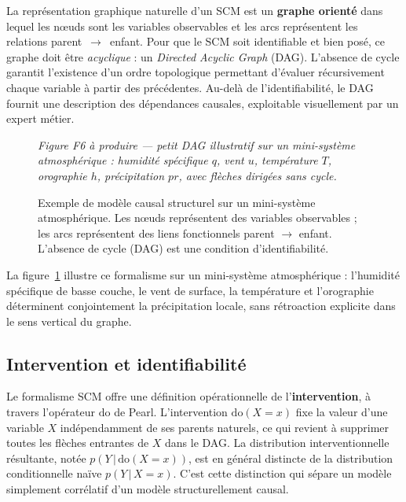 \documentclass[14pt,a4paper,openany]{extreport}
\theoremstyle{definition}
\newcommand{\figplaceholder}[2][0.9\linewidth]{%
  \begin{tcolorbox}[width=#1,height=5cm,valign=center,colback=gray!8,colframe=gray!45,arc=2pt,boxrule=0.5pt]
    \centering\small\textit{#2}
  \end{tcolorbox}%
}
\begin{document}
La représentation graphique naturelle d'un SCM est un \textbf{graphe orienté} dans lequel les n\oe uds sont les variables observables et les arcs représentent les relations parent~$\to$~enfant. Pour que le SCM soit identifiable et bien posé, ce graphe doit être \emph{acyclique} : un \emph{Directed Acyclic Graph} (DAG). L'absence de cycle garantit l'existence d'un ordre topologique permettant d'évaluer récursivement chaque variable à partir des précédentes. Au-delà de l'identifiabilité, le DAG fournit une description des dépendances causales, exploitable visuellement par un expert métier.

\begin{figure}[ht]
  \centering
  \figplaceholder[0.7\linewidth]{Figure F6 à produire --- petit DAG illustratif sur un mini-système atmosphérique : humidité spécifique $q$, vent $u$, température $T$, orographie $h$, précipitation $pr$, avec flèches dirigées sans cycle.}
  \caption{Exemple de modèle causal structurel sur un mini-système atmosphérique. Les n\oe uds représentent des variables observables ; les arcs représentent des liens fonctionnels parent $\to$ enfant. L'absence de cycle (DAG) est une condition d'identifiabilité.}
  \label{fig:scm-dag}
\end{figure}

La figure~\ref{fig:scm-dag} illustre ce formalisme sur un mini-système atmosphérique : l'humidité spécifique de basse couche, le vent de surface, la température et l'orographie déterminent conjointement la précipitation locale, sans rétroaction explicite dans le sens vertical du graphe.

\subsection{Intervention et identifiabilité}
\label{ssec:intervention}

Le formalisme SCM offre une définition opérationnelle de l'\textbf{intervention}, à travers l'opérateur $\mathrm{do}$ de Pearl. L'intervention $\mathrm{do}(X = x)$ fixe la valeur d'une variable $X$ indépendamment de ses parents naturels, ce qui revient à supprimer toutes les flèches entrantes de $X$ dans le DAG. La distribution interventionnelle résultante, notée $p\!\left(Y \,\big|\, \mathrm{do}(X = x)\right)$, est en général distincte de la distribution conditionnelle naïve $p(Y \,\big|\, X = x)$. C'est cette distinction qui sépare un modèle simplement corrélatif d'un modèle structurellement causal.
\end{document}
